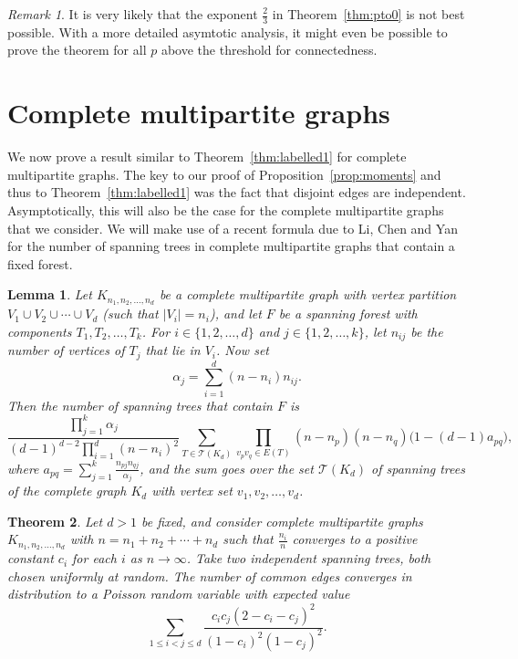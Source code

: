 \documentclass[a4paper,12pt,reqno]{amsart}
\newtheorem{lemma}{Lemma}
\newtheorem{theorem}[lemma]{Theorem}
\theoremstyle{remark}
\newtheorem{remark}{Remark}
\newcommand{\ga}{\alpha}
\begin{document}
\begin{remark}
It is very likely that the exponent $\frac23$ in Theorem~\ref{thm:pto0} is not best possible. With a more detailed asymtotic analysis, it might even be possible to prove the theorem for all $p$ above the threshold for connectedness.    
\end{remark}

\section{Complete multipartite graphs}\label{sec:multipartite}

We now prove a result similar to Theorem~\ref{thm:labelled1} for complete multipartite graphs. The key to our proof of Proposition~\ref{prop:moments} and thus to Theorem~\ref{thm:labelled1} was the fact that disjoint edges are independent. Asymptotically, this will also be the case for the complete multipartite graphs that we consider. We will make use of a recent formula due to Li, Chen and Yan \cite{lcy} for the number of spanning trees in complete multipartite graphs that contain a fixed forest. 

\begin{lemma}\label{lem:lcy-formula}
Let $K_{n_1,n_2,\ldots,n_d}$ be a complete multipartite graph with vertex partition $V_1 \cup V_2 \cup \cdots \cup V_d$ (such that $|V_i| = n_i$), and let $F$ be a spanning forest with components $T_1,T_2,\ldots,T_k$. For $i \in \{1,2,\ldots,d\}$ and $j \in \{1,2,\ldots,k\}$, let $n_{ij}$ be the number of vertices of $T_j$ that lie in $V_i$. Now set
\[\ga_j = \sum_{i=1}^d (n-n_i)n_{ij}.\]
Then the number of spanning trees that contain $F$ is
\[\frac{\prod_{j=1}^k \ga_j}{(d-1)^{d-2} \prod_{i=1}^d (n-n_i)^2} \sum_{T \in \mathcal{T}(K_d)} \prod_{v_pv_q \in E(T)} (n-n_p)(n-n_q) \big( 1 - (d-1)a_{pq} \big),\]
where $a_{pq} = \sum_{j=1}^k \frac{n_{pj}n_{qj}}{\ga_j}$, and the sum goes over the set $\mathcal{T}(K_d)$ of spanning trees of the complete graph $K_d$ with vertex set $v_1,v_2,\ldots,v_d$.
\end{lemma}

\begin{theorem}\label{thm:multipartite}
Let $d > 1$ be fixed, and consider complete multipartite graphs $K_{n_1,n_2,\ldots,n_d}$ with $n = n_1 + n_2 + \cdots + n_d$ such that $\frac{n_i}{n}$ converges to a positive constant $c_i$ for each $i$ as $n \to \infty$. Take two independent spanning trees, both chosen uniformly at random. The number of common edges converges in distribution to a Poisson random variable with expected value
\[\sum_{1 \leq i < j \leq d} \frac{c_i c_j (2-c_i-c_j)^2}{(1-c_i)^2(1-c_j)^2}.\]
\end{theorem}
\end{document}
